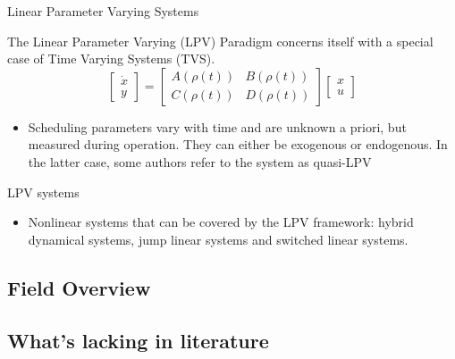 \begin{frame}{Linear Parameter Varying Systems}
\begin{block}{}
The Linear Parameter Varying (LPV) Paradigm concerns itself with a special case of Time Varying Systems (TVS). 
\begin{equation}  \label{eq:gen_LPV}
\begin{bmatrix}
\dot{x}\\
y
\end{bmatrix} = \begin{bmatrix}
A(\rho(t)) & B(\rho(t))\\
C(\rho(t)) & D(\rho(t))
\end{bmatrix}\begin{bmatrix}
x\\
u
\end{bmatrix}
\end{equation}
\end{block}

\begin{itemize}
	\item Scheduling parameters vary with time and are unknown a priori, but measured during operation. They can either be exogenous or endogenous. In the latter case, some authors refer to the system as quasi-LPV  \autocite{Sename}
\end{itemize}

\end{frame}
\begin{frame}{LPV systems}
    \begin{itemize}
        \item Nonlinear systems that can be covered by the LPV framework: hybrid dynamical systems, jump linear systems and switched linear systems. \autocite{Hoffmann2015}
    \end{itemize}
\end{frame}
\subsection{Field Overview}

\subsection{What's lacking in literature}

